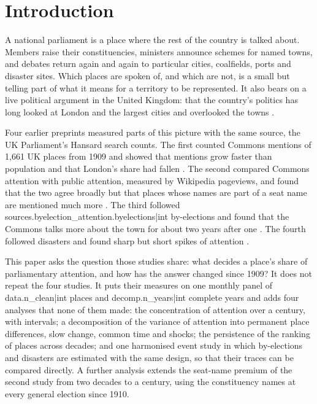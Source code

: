 \documentclass[11pt,a4paper]{article}
\begin{document}
\section{Introduction}
A national parliament is a place where the rest of the country is talked about. Members raise their constituencies, ministers announce schemes for named towns, and debates return again and again to particular cities, coalfields, ports and disaster sites. Which places are spoken of, and which are not, is a small but telling part of what it means for a territory to be represented. It also bears on a live political argument in the United Kingdom: that the country's politics has long looked at London and the largest cities and overlooked the towns \citep{mccann2020,rodriguezpose2018,jenningsstoker2016}.

Four earlier preprints measured parts of this picture with the same source, the UK Parliament's Hansard search counts. The first counted Commons mentions of 1,661 UK places from 1909 and showed that mentions grow faster than population and that London's share had fallen \citep{hotham2026a}. The second compared Commons attention with public attention, measured by Wikipedia pageviews, and found that the two agree broadly but that places whose names are part of a seat name are mentioned much more \citep{hotham2026b}. The third followed {{sources.byelection_attention.byelections|int}} by-elections and found that the Commons talks more about the town for about two years after one \citep{hotham2026c}. The fourth followed disasters and found sharp but short spikes of attention \citep{hotham2026d}.

This paper asks the question those studies share: what decides a place's share of parliamentary attention, and how has the answer changed since 1909? It does not repeat the four studies. It puts their measures on one monthly panel of {{data.n_clean|int}} places and {{decomp.n_years|int}} complete years and adds four analyses that none of them made: the concentration of attention over a century, with intervals; a decomposition of the variance of attention into permanent place differences, slow change, common time and shocks; the persistence of the ranking of places across decades; and one harmonised event study in which by-elections and disasters are estimated with the same design, so that their traces can be compared directly. A further analysis extends the seat-name premium of the second study from two decades to a century, using the constituency names at every general election since 1910.
\end{document}
